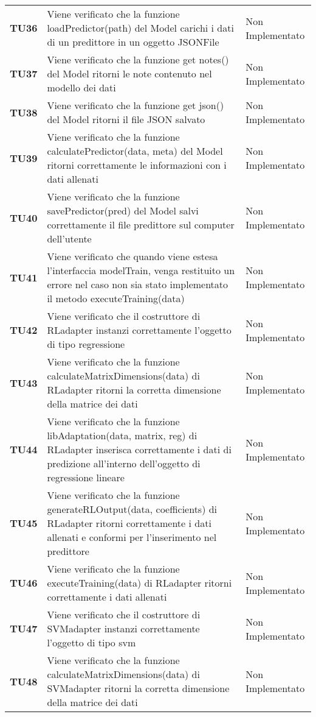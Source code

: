 \documentclass[../piano-di-qualifica.tex]{subfiles}
\begin{document}
\begin{longtable}[H]{>{\centering\bfseries}m{2.5cm} >{\centering}m{7.5cm} >{\centering\arraybackslash}m{3.5cm}}
  \textbf{TU36} & Viene verificato che la funzione loadPredictor(path) del Model carichi i dati di un predittore in un oggetto JSONFile & Non Implementato \\
  \textbf{TU37} & Viene verificato che la funzione get notes() del Model ritorni le note contenuto nel modello dei dati & Non Implementato \\
  \textbf{TU38} & Viene verificato che la funzione get json() del Model ritorni il file JSON salvato & Non Implementato \\
  \textbf{TU39} & Viene verificato che la funzione calculatePredictor(data, meta) del Model ritorni correttamente le informazioni con i dati allenati & Non Implementato \\
  \textbf{TU40} & Viene verificato che la funzione savePredictor(pred) del Model salvi correttamente il file predittore sul computer dell'utente & Non Implementato \\
  \textbf{TU41} & Viene verificato che quando viene estesa l'interfaccia modelTrain, venga restituito un errore nel caso non sia stato implementato il metodo executeTraining(data) & Non Implementato \\
  \textbf{TU42} & Viene verificato che il costruttore di RLadapter instanzi correttamente l'oggetto di tipo regressione & Non Implementato \\
  \textbf{TU43} & Viene verificato che la funzione calculateMatrixDimensions(data) di RLadapter ritorni la corretta dimensione della matrice dei dati & Non Implementato \\
  \textbf{TU44} & Viene verificato che la funzione libAdaptation(data, matrix, reg) di RLadapter inserisca correttamente i dati di predizione all'interno dell'oggetto di regressione lineare & Non Implementato \\
  \textbf{TU45} & Viene verificato che la funzione generateRLOutput(data, coefficients) di RLadapter ritorni correttamente i dati allenati e conformi per l'inserimento nel predittore & Non Implementato \\
  \textbf{TU46} & Viene verificato che la funzione executeTraining(data) di RLadapter ritorni correttamente i dati allenati & Non Implementato \\
  \textbf{TU47} & Viene verificato che il costruttore di SVMadapter instanzi correttamente l'oggetto di tipo svm & Non Implementato \\
  \textbf{TU48} & Viene verificato che la funzione calculateMatrixDimensions(data) di SVMadapter ritorni la corretta dimensione della matrice dei dati & Non Implementato \\

\end{longtable}
\end{document}
